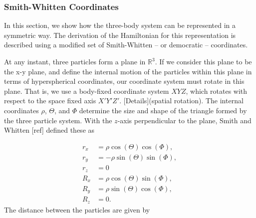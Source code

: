 \documentclass{article}
\numberwithin{equation}{section}
\begin{document}
\subsubsection{Smith-Whitten Coordinates}\label{smith}

In this section, we show how the three-body system can be represented in a symmetric way. The derivation of the Hamiltonian for this representation is described using a modified set of Smith-Whitten -- or democratic -- coordinates. 

At any instant, three particles form a plane in $\mathbb{R}^3$. If we consider this plane to be the x-y plane, and define the internal motion of the particles within this plane in terms of  hyperspherical coordinates, our coordinate system must rotate in this plane. That is, we use a body-fixed coordinate system $XYZ$, which rotates with respect to the space fixed axis $X'Y'Z'$. [Details](spatial rotation). The internal coordinates $\rho$, $\Theta$, and $\Phi$ determine the size and shape of the triangle formed by the three particle system. With the $z$-axis perpendicular to the plane, Smith and Whitten [ref] defined these as   

\begin{subequations}
\begin{align*}
	r_x &= \rho \cos(\Theta)\cos(\Phi),\\
	r_y &= -\rho \sin(\Theta)\sin(\Phi),\\
	r_z &= 0\\
	R_x &= \rho \cos(\Theta)\sin(\Phi),\\
	R_y &= \rho \sin(\Theta)\cos(\Phi),\\
	R_z &= 0.
\end{align*}   
\end{subequations}
The distance between the particles are given by
\end{document}
